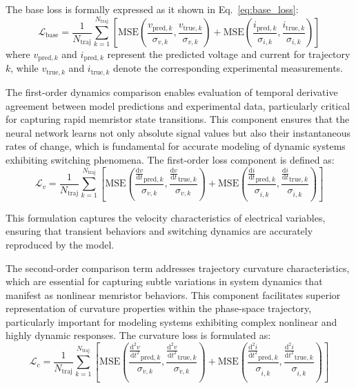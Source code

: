 \documentclass[11pt, oneside]{article}
\begin{document}
The base loss is formally expressed as it shown in Eq.~\eqref{eq:base_loss}:
\begin{equation}
    \mathcal{L}_{\mathrm{base}} = \frac{1}{N_{\text{traj}}} \sum_{k=1}^{N_{\text{traj}}} \left[\mathrm{MSE}\left(\frac{v_{\mathrm{pred},k}}{\sigma_{v,k}}, \frac{v_{\mathrm{true},k}}{\sigma_{v,k}}\right) +  \mathrm{MSE}\left(\frac{i_{\mathrm{pred},k}}{\sigma_{i,k}}, \frac{i_{\mathrm{true},k}}{\sigma_{i,k}}\right)\right]
    \label{eq:base_loss}
\end{equation}
where $v_{\mathrm{pred},k}$ and $i_{\mathrm{pred},k}$ represent the predicted voltage and current for trajectory $k$, while $v_{\mathrm{true},k}$ and $i_{\mathrm{true},k}$ denote the corresponding experimental measurements.

The first-order dynamics comparison enables evaluation of temporal derivative agreement between model predictions and experimental data, particularly critical for capturing rapid memristor state transitions. This component ensures that the neural network learns not only absolute signal values but also their instantaneous rates of change, which is fundamental for accurate modeling of dynamic systems exhibiting switching phenomena. The first-order loss component is defined as:
\begin{equation}
    \mathcal{L}_{v} = \frac{1}{N_{\text{traj}}} \sum_{k=1}^{N_{\text{traj}}} \left[
        \mathrm{MSE}\left(\frac{\tfrac{\mathrm{d}v}{\mathrm{d}t}_{\mathrm{pred},k}}{\sigma_{\dot{v},k}}, \frac{\tfrac{\mathrm{d}v}{\mathrm{d}t}_{\mathrm{true},k}}{\sigma_{\dot{v},k}}\right) +
        \mathrm{MSE}\left(\frac{\tfrac{\mathrm{d}i}{\mathrm{d}t}_{\mathrm{pred},k}}{\sigma_{\dot{i},k}}, \frac{\tfrac{\mathrm{d}i}{\mathrm{d}t}_{\mathrm{true},k}}{\sigma_{\dot{i},k}}\right)
        \right]
    \label{eq:loss_v}
\end{equation}

This formulation captures the velocity characteristics of electrical variables, ensuring that transient behaviors and switching dynamics are accurately reproduced by the model.

The second-order comparison term addresses trajectory curvature characteristics, which are essential for capturing subtle variations in system dynamics that manifest as nonlinear memristor behaviors. This component facilitates superior representation of curvature properties within the phase-space trajectory, particularly important for modeling systems exhibiting complex nonlinear and highly dynamic responses. The curvature loss is formulated as:
\begin{equation}
    \mathcal{L}_{c} = \frac{1}{N_{\text{traj}}} \sum_{k=1}^{N_{\text{traj}}} \left[
        \mathrm{MSE}\left(\frac{\tfrac{\mathrm{d}^2 v}{\mathrm{d}t^2}_{\mathrm{pred},k}}{\sigma_{\ddot{v},k}}, \frac{\tfrac{\mathrm{d}^2 v}{\mathrm{d}t^2}_{\mathrm{true},k}}{\sigma_{\ddot{v},k}}\right) +
        \mathrm{MSE}\left(\frac{\tfrac{\mathrm{d}^2 i}{\mathrm{d}t^2}_{\mathrm{pred},k}}{\sigma_{\ddot{i},k}}, \frac{\tfrac{\mathrm{d}^2 i}{\mathrm{d}t^2}_{\mathrm{true},k}}{\sigma_{\ddot{i},k}}\right)
        \right]
    \label{eq:loss_c}
\end{equation}
\end{document}
